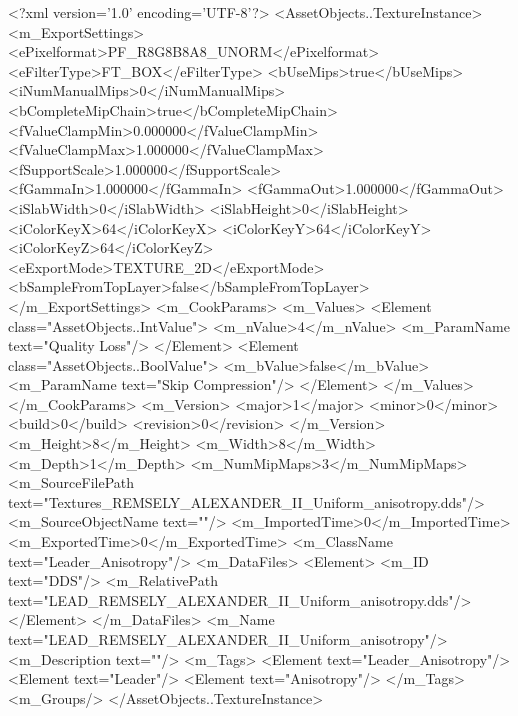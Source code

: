 <?xml version='1.0' encoding='UTF-8'?>
<AssetObjects..TextureInstance>
  <m_ExportSettings>
    <ePixelformat>PF_R8G8B8A8_UNORM</ePixelformat>
    <eFilterType>FT_BOX</eFilterType>
    <bUseMips>true</bUseMips>
    <iNumManualMips>0</iNumManualMips>
    <bCompleteMipChain>true</bCompleteMipChain>
    <fValueClampMin>0.000000</fValueClampMin>
    <fValueClampMax>1.000000</fValueClampMax>
    <fSupportScale>1.000000</fSupportScale>
    <fGammaIn>1.000000</fGammaIn>
    <fGammaOut>1.000000</fGammaOut>
    <iSlabWidth>0</iSlabWidth>
    <iSlabHeight>0</iSlabHeight>
    <iColorKeyX>64</iColorKeyX>
    <iColorKeyY>64</iColorKeyY>
    <iColorKeyZ>64</iColorKeyZ>
    <eExportMode>TEXTURE_2D</eExportMode>
    <bSampleFromTopLayer>false</bSampleFromTopLayer>
  </m_ExportSettings>
  <m_CookParams>
    <m_Values>
      <Element class="AssetObjects..IntValue">
        <m_nValue>4</m_nValue>
        <m_ParamName text="Quality Loss"/>
      </Element>
      <Element class="AssetObjects..BoolValue">
        <m_bValue>false</m_bValue>
        <m_ParamName text="Skip Compression"/>
      </Element>
    </m_Values>
  </m_CookParams>
  <m_Version>
    <major>1</major>
    <minor>0</minor>
    <build>0</build>
    <revision>0</revision>
  </m_Version>
  <m_Height>8</m_Height>
  <m_Width>8</m_Width>
  <m_Depth>1</m_Depth>
  <m_NumMipMaps>3</m_NumMipMaps>
  <m_SourceFilePath text="Textures\LEAD_REMSELY_ALEXANDER_II_Uniform_anisotropy.dds"/>
  <m_SourceObjectName text=""/>
  <m_ImportedTime>0</m_ImportedTime>
  <m_ExportedTime>0</m_ExportedTime>
  <m_ClassName text="Leader_Anisotropy"/>
  <m_DataFiles>
    <Element>
      <m_ID text="DDS"/>
      <m_RelativePath text="LEAD_REMSELY_ALEXANDER_II_Uniform_anisotropy.dds"/>
    </Element>
  </m_DataFiles>
  <m_Name text="LEAD_REMSELY_ALEXANDER_II_Uniform_anisotropy"/>
  <m_Description text=""/>
  <m_Tags>
    <Element text="Leader_Anisotropy"/>
    <Element text="Leader"/>
    <Element text="Anisotropy"/>
  </m_Tags>
  <m_Groups/>
</AssetObjects..TextureInstance>
